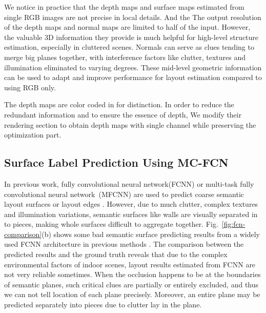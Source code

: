 We notice in practice that the depth maps and surface maps estimated from single RGB images are not precise in local details. And the The output resolution of the depth maps and normal maps are limited to half of the input. However, the valuable 3D information they provide is much helpful for high-level structure estimation, especially in cluttered scenes.  
%
Normals can serve as clues tending to merge big planes together, with interference factors like clutter, textures and illumination eliminated to varying degrees. 
%
These mid-level geometric information can be used to adapt and improve performance for layout estimation compared to using RGB only. 

The depth maps are color coded in \cite{eigen2015predicting} for distinction. In order to reduce the redundant information and to ensure the essence of depth, We modify their rendering section to obtain depth maps with single channel while preserving the optimization part.

\subsection{Surface Label Prediction Using MC-FCN}
\label{sec:surfacelabel}
%
In previous work, fully convolutional neural network(FCNN) or multi-task fully convolutional neural network~(MFCNN) are used to predict coarse semantic layout surfaces or layout edges \cite{dasgupta2016delay,ren2016coarse,zhao2017physics,zhang2017learning}. 
%
However, due to much clutter, complex textures and illumination variations, semantic surfaces like walls are visually separated in to pieces, making whole surfaces difficult to aggregate together. 
%
Fig.~\ref{fig:fcn-comparison}(b) shows some bad semantic surface predicting results from a widely used FCNN architecture in previous methods \cite{dasgupta2016delay,ren2016coarse}. 
The comparison between the predicted results and the ground truth reveals that due to the complex environmental factors of indoor scenes, layout results estimated from FCNN are not very reliable sometimes. 
When the occlusion happens to be at the boundaries of semantic planes, such critical clues are partially or entirely excluded, and thus we can not tell location of each plane precisely. 
Moreover, an entire plane may be predicted separately into pieces due to clutter lay in the plane.


